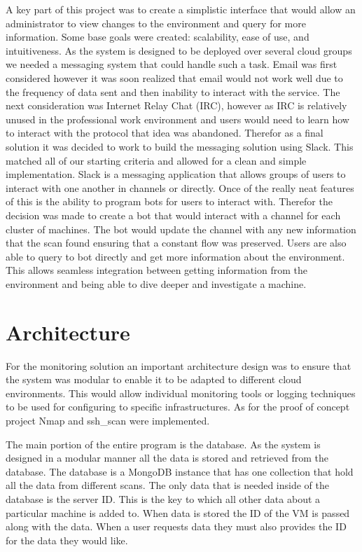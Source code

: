 \documentclass[12pt]{article}
\begin{document}
A key part of this project was to create a simplistic interface that would allow an administrator to view changes to the environment and query for more information. Some base goals were created: scalability, ease of use, and intuitiveness. As the system is designed to be deployed over several cloud groups we needed a messaging system that could handle such a task. Email was first considered however it was soon realized that email would not work well due to the frequency of data sent and then inability to interact with the service. The next consideration was Internet Relay Chat (IRC), however as IRC is relatively unused in the professional work environment and users would need to learn how to interact with the protocol that idea was abandoned. Therefor as a final solution it was decided to work to build the messaging solution using Slack. This matched all of our starting criteria and allowed for a clean and simple implementation. Slack is a messaging application that allows groups of users to interact with one another in channels or directly. Once of the really neat features of this is the ability to program bots for users to interact with. Therefor the decision was made to create a bot that would interact with a channel for each cluster of machines. The bot would update the channel with any new information that the scan found ensuring that a constant flow was preserved. Users are also able to query to bot directly and get more information about the environment. This allows seamless integration between getting information from the environment and being able to dive deeper and investigate a machine.


\section{Architecture}
For the monitoring solution an important architecture design was to ensure that the system was modular to enable it to be adapted to different cloud environments. This would allow individual monitoring tools or logging techniques to be used for configuring to specific infrastructures. As for the proof of concept project Nmap and ssh\_scan were implemented.

The main portion of the entire program is the database. As the system is designed in a modular manner all the data is stored and retrieved from the database. The database is a MongoDB instance that has one collection that hold all the data from different scans. The only data that is needed inside of the database is the server ID\@. This is the key to which all other data about a particular machine is added to. When data is stored the ID of the VM is passed along with the data. When a user requests data they must also provides the ID for the data they would like.
\end{document}
